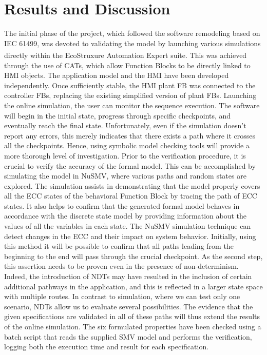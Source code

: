 \documentclass{ieeeojies}
\begin{document}
\section{Results and Discussion}
\label{sec:results}
The initial phase of the project, which followed the software remodeling based on IEC 61499, was devoted to validating the model by launching various simulations directly within the EcoStruxure\textsuperscript{\texttrademark} Automation Expert suite.
This was achieved through the use of CATs, which allow Function Blocks to be directly linked to HMI objects.
The application model and the HMI have been developed independently. Once sufficiently stable, the HMI plant FB was connected to the controller FBs, replacing the existing simplified version of plant FBs.
Launching the online simulation, the user can monitor the sequence execution. The software will begin in the initial state, progress through specific checkpoints, and eventually reach the final state.
Unfortunately, even if the simulation doesn't report any errors, this merely indicates that there exists a path where it crosses all the checkpoints.
Hence, using symbolic model checking tools will provide a more thorough level of investigation.
Prior to the verification procedure, it is crucial to verify the accuracy of the formal model. This can be accomplished by simulating the model in NuSMV, where various paths and random states are explored.
The simulation assists in demonstrating that the model properly covers all the ECC states of the behavioral Function Block by tracing the path of ECC states. It also helps to confirm that the generated formal model behaves in accordance with the discrete state model by providing information about the values of all the variables in each state.
The NuSMV simulation technique can detect changes in the ECC and their impact on system behavior.
Initially, using this method it will be possible to confirm that all paths leading from the beginning to the end will pass through the crucial checkpoint. As the second step, this assertion needs to be proven even in the presence of non-determinism.
Indeed, the introduction of NDTs may have resulted in the inclusion of certain additional pathways in the application, and this is reflected in a larger state space with multiple routes. In contrast to simulation, where we can test only one scenario, NDTs allow us to evaluate several possibilities. The evidence that the given specifications are validated in all of these paths will thus extend the results of the online simulation. The six formulated properties have been checked using a batch script that reads the supplied SMV model and performs the verification, logging both the execution time and result for each specification. 
\end{document}
